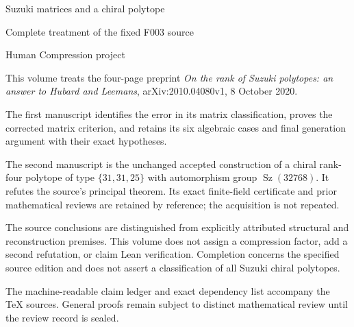 \documentclass[11pt,a4paper]{article}
\begin{document}
\thispagestyle{empty}
\begin{center}
{\LARGE Suzuki matrices and a chiral polytope}\par\vspace{10pt}
{\large Complete treatment of the fixed F003 source}\par\vspace{12pt}
Human Compression project
\end{center}
\bigskip
This volume treats the four-page preprint
\emph{On the rank of Suzuki polytopes: an answer to Hubard and
Leemans}, arXiv:2010.04080v1, 8 October 2020.

The first manuscript identifies the error in its matrix classification,
proves the corrected matrix criterion, and retains its six algebraic
cases and final generation argument with their exact hypotheses.

The second manuscript is the unchanged accepted construction of a
chiral rank-four polytope of type $\{31,31,25\}$ with automorphism
group $\operatorname{Sz}(32768)$. It refutes the source's principal
theorem. Its exact finite-field certificate and prior mathematical
reviews are retained by reference; the acquisition is not repeated.

The source conclusions are distinguished from explicitly attributed
structural and reconstruction premises. This volume does not assign
a compression factor, add a second refutation, or claim Lean
verification. Completion concerns the specified source edition and
does not assert a classification of all Suzuki chiral polytopes.

\vfill
The machine-readable claim ledger and exact dependency list accompany
the TeX sources. General proofs remain subject to distinct mathematical
review until the review record is sealed.
\clearpage


\end{document}
